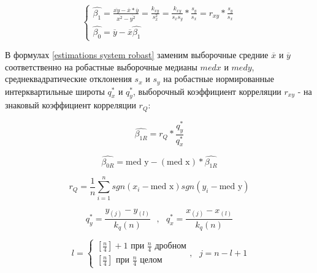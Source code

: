 \documentclass[a4paper]{article}
\begin{document}
    \begin{equation} \label{estimations system robast}
        \begin{cases}
            \widehat{\beta_1} = \frac{\overline{x y} - \overline{x} * \overline{y}}{\overline{x^2} - \overline{y^2}} = \frac{k_{x y}}{s_x^2} = \frac{k_{x y}}{s_x s_y} * \frac{s_y}{s_x} = r_{x y} * \frac{s_y}{s_x}\\
            \widehat{\beta_0} = \overline{y} - \overline{x} \widehat{\beta_1} 
        \end{cases}
    \end{equation}
    
    В формулах \ref{estimations system robast} заменим выборочные средние $\overline{x}$ и $\overline{y}$ соответственно на робастные выборочные медианы $med x$ и $med y$, среднеквадратические отклонения $s_x$ и $s_y$ на робастные нормированные интерквартильные широты $q_x^{*}$ и $q_y^{*}$, выборочный коэффициент корреляции $r_{x y}$ - на знаковый коэффициент корреляции $r_Q$:
    
    \begin{equation} \label{beta 1 R}
        \widehat{\beta_{1R}} = r_Q * \frac{q^*_y}{q^*_x}
    \end{equation}
    
    \begin{equation} \label{beta 0 R}
        \widehat{\beta_{0 R}} = \text{med y} - (\text{med x}) * \widehat{\beta_{1 R}}
    \end{equation}
    
    \begin{equation} \label{r_Q}
        r_Q = \frac{1}{n}\sum\limits^{n}_{i=1}{sgn(x_i - \text{med x})sgn(y_i - \text{med y})}
    \end{equation}
    
    \begin{equation} \label{q_x and q_y}
        q_y^* = \frac{y_{(j)} - y_{(l)}}{k_q(n)} \text{ }, \text{ } q_x^* = \frac{x_{(j)} - x_{(l)}}{k_q(n)} 
    \end{equation}
    
    \begin{equation} \label{l system}
        l = 
        \begin{cases}
            [\frac{n}{4}] + 1 \text{ при } \frac{n}{4} \text{ дробном} \\
            [\frac{n}{4}] \text{ при } \frac{n}{4} \text{ целом}
        \end{cases}
        , \text{ } j = n - l + 1
    \end{equation}
    
\end{document}
